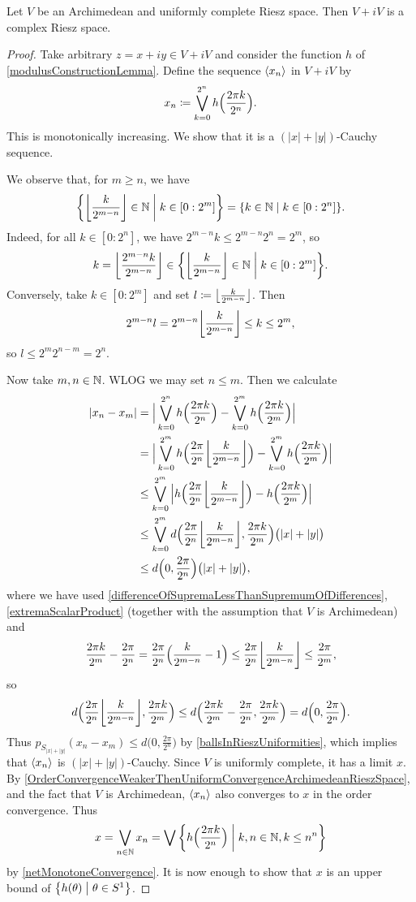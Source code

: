 \begin{proposition}
Let $V$ be an Archimedean and uniformly complete Riesz space. Then $V+iV$ is a complex Riesz space.
\end{proposition}
\begin{proof}
Take arbitrary $z = x+iy \in V+iV$ and consider the function $h$ of \ref{modulusConstructionLemma}.
Define the sequence $\seq{x_n}$ in $V+iV$ by
\[ x_n \defeq \bigvee_{k=0}^{2^n} h\Big(\frac{2\pi k}{2^n}\Big). \]
This is monotonically increasing. We show that it is a $(|x|+|y|)$-Cauchy sequence.

We observe that, for $m\geq n$, we have
\[ \setbuilder{\floor*{\frac{k}{2^{m-n}}}\in \N}{k\in [0:2^m]} = \setbuilder{k\in \N}{k\in [0:2^n]}. \]
Indeed, for all $k\in [0:2^n]$, we have $2^{m-n}k \leq 2^{m-n}2^n = 2^m$, so
\[ k = \floor*{\frac{2^{m-n}k}{2^{m-n}}} \in \setbuilder{\floor*{\frac{k}{2^{m-n}}}\in \N}{k\in [0:2^m]}. \]
Conversely, take $k \in [0:2^m]$ and set $l \defeq \floor*{\frac{k}{2^{m-n}}}$. Then
\[ 2^{m-n}l = 2^{m-n}\floor*{\frac{k}{2^{m-n}}} \leq k \leq 2^m, \]
so $l \leq 2^m2^{n-m} = 2^n$.

Now take $m,n\in \N$. WLOG we may set $n\leq m$. Then we calculate
\begin{align*}
|x_n - x_m| &= \Big|\bigvee_{k=0}^{2^n} h\Big(\frac{2\pi k}{2^n}\Big) - \bigvee_{k=0}^{2^m} h\Big(\frac{2\pi k}{2^m}\Big)\Big| \\
&= \Big|\bigvee_{k=0}^{2^m} h\Big(\frac{2\pi}{2^n}\floor*{\frac{k}{2^{m-n}}}\Big) - \bigvee_{k=0}^{2^m} h\Big(\frac{2\pi k}{2^m}\Big)\Big| \\
&\leq \bigvee_{k=0}^{2^m}\Big| h\Big(\frac{2\pi}{2^n}\floor*{\frac{k}{2^{m-n}}}\Big) - h\Big(\frac{2\pi k}{2^m}\Big)\Big| \\
&\leq \bigvee_{k=0}^{2^m}d\Big(\frac{2\pi}{2^n}\floor*{\frac{k}{2^{m-n}}}, \frac{2\pi k}{2^m}\Big)\big(|x| + |y|\big) \\
&\leq d\Big(0,\frac{2\pi}{2^n}\Big)\big(|x|+|y|\big),
\end{align*}
where we have used \ref{differenceOfSupremaLessThanSupremumOfDifferences}, \ref{extremaScalarProduct} (together with the assumption that $V$ is Archimedean) and
\[ \frac{2\pi k}{2^m} - \frac{2\pi}{2^n} = \frac{2\pi}{2^n}\Big(\frac{k}{2^{m-n}} - 1\Big) \leq \frac{2\pi}{2^n}\floor*{\frac{k}{2^{m-n}}} \leq \frac{2\pi}{2^m}, \]
so
\[ d\Big(\frac{2\pi}{2^n}\floor*{\frac{k}{2^{m-n}}}, \frac{2\pi k}{2^m}\Big) \leq d\Big(\frac{2\pi k}{2^m} - \frac{2\pi}{2^n}, \frac{2\pi k}{2^m}\Big) = d\Big(0, \frac{2\pi}{2^n}\Big). \]
Thus $p_{S_{|x|+|y|}}(x_n - x_m) \leq d\Big(0,\frac{2\pi}{2^n}\Big)$ by \ref{ballsInRieszUniformities}, which implies that $\seq{x_n}$ is $(|x|+|y|)$-Cauchy.
Since $V$ is uniformly complete, it has a limit $x$. By \ref{OrderConvergenceWeakerThenUniformConvergenceArchimedeanRieszSpace}, and the fact that $V$ is Archimedean, $\seq{x_n}$ also converges to $x$ in the order convergence. Thus
\[ x = \bigvee_{n\in \N}x_n = \bigvee \setbuilder{h\Big(\frac{2\pi k}{2^n}\Big)}{k,n\in\N, k\leq n^n} \]
by \ref{netMonotoneConvergence}. It is now enough to show that $x$ is an upper bound of $\setbuilder{h(\theta)}{\theta\in S^1}$.


\end{proof}
